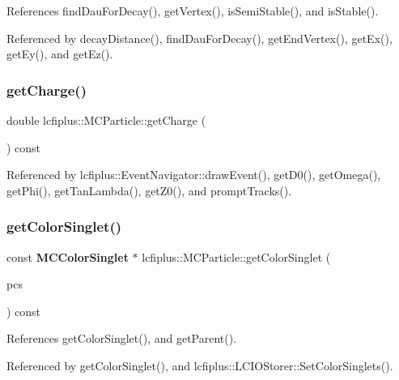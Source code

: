 References find\+Dau\+For\+Decay(), get\+Vertex(), is\+Semi\+Stable(), and is\+Stable().



Referenced by decay\+Distance(), find\+Dau\+For\+Decay(), get\+End\+Vertex(), get\+Ex(), get\+Ey(), and get\+Ez().

\mbox{\label{classlcfiplus_1_1MCParticle_a1fee46ae25fa1dcb7dc8fb0839788f2b}} 
\subsubsection{get\+Charge()}
{\footnotesize\ttfamily double lcfiplus\+::\+M\+C\+Particle\+::get\+Charge (\begin{DoxyParamCaption}{ }\end{DoxyParamCaption}) const\hspace{0.3cm}{\ttfamily [inline]}}



Referenced by lcfiplus\+::\+Event\+Navigator\+::draw\+Event(), get\+D0(), get\+Omega(), get\+Phi(), get\+Tan\+Lambda(), get\+Z0(), and prompt\+Tracks().

\mbox{\label{classlcfiplus_1_1MCParticle_af293d94031e4cee29a6cf879dec735ad}} 
\subsubsection{get\+Color\+Singlet()}
{\footnotesize\ttfamily const \textbf{ M\+C\+Color\+Singlet} $\ast$ lcfiplus\+::\+M\+C\+Particle\+::get\+Color\+Singlet (\begin{DoxyParamCaption}\item[{const vector$<$ const \textbf{ M\+C\+Color\+Singlet} $\ast$$>$ $\ast$}]{pcs }\end{DoxyParamCaption}) const}



References get\+Color\+Singlet(), and get\+Parent().



Referenced by get\+Color\+Singlet(), and lcfiplus\+::\+L\+C\+I\+O\+Storer\+::\+Set\+Color\+Singlets().

\mbox{\label{classlcfiplus_1_1MCParticle_a55b93c0753e90a2442db71ae40bcc881}} 
